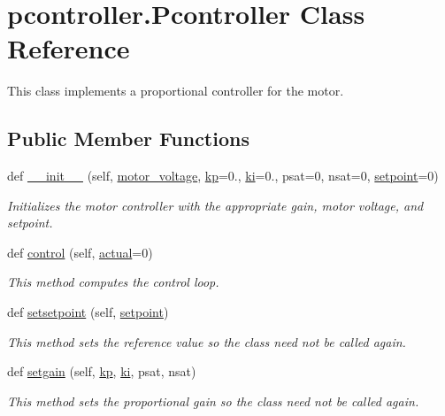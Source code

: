 \hypertarget{classpcontroller_1_1Pcontroller}{}\section{pcontroller.\+Pcontroller Class Reference}
\label{classpcontroller_1_1Pcontroller}


This class implements a proportional controller for the motor.  


\subsection*{Public Member Functions}
\begin{DoxyCompactItemize}
\item 
def \hyperlink{classpcontroller_1_1Pcontroller_af4560987e4c627b66086adc25d163131}{\+\_\+\+\_\+init\+\_\+\+\_\+} (self, \hyperlink{classpcontroller_1_1Pcontroller_ad3d59362de420027d1992bb5d32d2e15}{motor\+\_\+voltage}, \hyperlink{classpcontroller_1_1Pcontroller_aec6beda8c32175f3537e50cd1b30d6e9}{kp}=0., \hyperlink{classpcontroller_1_1Pcontroller_aa22988c44417c1a85f34f569499d95b8}{ki}=0., psat=0, nsat=0, \hyperlink{classpcontroller_1_1Pcontroller_abf2da52e74277024c07eb12d2d9d8c47}{setpoint}=0)
\begin{DoxyCompactList}\small\item\em Initializes the motor controller with the appropriate gain, motor voltage, and setpoint. \end{DoxyCompactList}\item 
def \hyperlink{classpcontroller_1_1Pcontroller_a529ae3c0b7e93ff7226c3a87203bad9c}{control} (self, \hyperlink{classpcontroller_1_1Pcontroller_adc23f159a284c2e35a9ff09025de0fd6}{actual}=0)
\begin{DoxyCompactList}\small\item\em This method computes the control loop. \end{DoxyCompactList}\item 
def \hyperlink{classpcontroller_1_1Pcontroller_ab0b68328ae83575b041ac7e9b38634bf}{setsetpoint} (self, \hyperlink{classpcontroller_1_1Pcontroller_abf2da52e74277024c07eb12d2d9d8c47}{setpoint})
\begin{DoxyCompactList}\small\item\em This method sets the reference value so the class need not be called again. \end{DoxyCompactList}\item 
def \hyperlink{classpcontroller_1_1Pcontroller_a1336761292100d394eed2f825eb782e7}{setgain} (self, \hyperlink{classpcontroller_1_1Pcontroller_aec6beda8c32175f3537e50cd1b30d6e9}{kp}, \hyperlink{classpcontroller_1_1Pcontroller_aa22988c44417c1a85f34f569499d95b8}{ki}, psat, nsat)
\begin{DoxyCompactList}\small\item\em This method sets the proportional gain so the class need not be called again. \end{DoxyCompactList}\end{DoxyCompactItemize}
